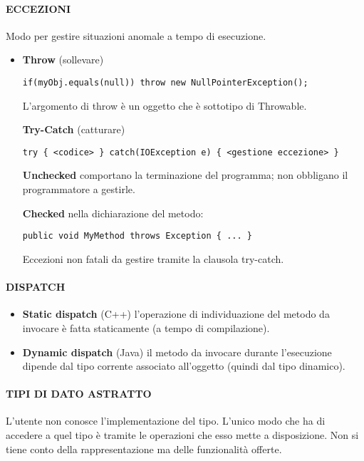 \documentclass[a4paper, 12pt]{article}
\begin{document}
\paragraph{ECCEZIONI}
Modo per gestire situazioni anomale a tempo di esecuzione.
\begin{itemize}
    \item \textbf{Throw} (sollevare)
    \begin{lstlisting}
if(myObj.equals(null)) throw new NullPointerException();   
    \end{lstlisting}
    L'argomento di throw è un oggetto che è sottotipo di Throwable.
    
    \textbf{Try-Catch} (catturare)
    \begin{lstlisting}
try { <codice> } catch(IOException e) { <gestione eccezione> }   
    \end{lstlisting}
    
    \textbf{Unchecked} comportano la terminazione del programma; non obbligano
    il programmatore a gestirle.
    
    \textbf{Checked} nella dichiarazione del metodo:
    \begin{lstlisting}
public void MyMethod throws Exception { ... } 
    \end{lstlisting}
    Eccezioni non fatali da gestire tramite la clausola try-catch.
\end{itemize}

\paragraph{DISPATCH}
\begin{itemize}
    \item \textbf{Static dispatch} (C++) l'operazione di individuazione del metodo da
    invocare è fatta staticamente (a tempo di compilazione).
    \item \textbf{Dynamic dispatch} (Java) il metodo da invocare durante l'esecuzione
    dipende dal tipo corrente associato all'oggetto (quindi dal tipo dinamico).
\end{itemize}

\paragraph{TIPI DI DATO ASTRATTO}
L'utente non conosce l'implementazione del tipo. L'unico modo che ha di accedere a
quel tipo è tramite le operazioni che esso mette a disposizione. Non si tiene conto della
rappresentazione ma delle funzionalità offerte.
\end{document}
